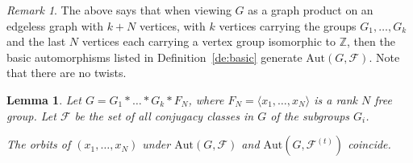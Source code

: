 \documentclass[a4paper,english,11pt]{article}
\newtheorem{lemma}[de]{Lemma}
\theoremstyle{definition}
\theoremstyle{remark}
\newtheorem{rk}[de]{Remark}
\newcommand{\Aut}{\mathrm{Aut}}
\newcommand{\calf}{\mathcal{F}}
\begin{document}
\begin{rk}\label{rk:FR}
The above says that when viewing $G$ as a graph product on an edgeless graph with $k+N$ vertices, with $k$ vertices carrying the groups $G_1,\dots,G_k$ and the last $N$ vertices each carrying a vertex group isomorphic to $\mathbb{Z}$, then the basic automorphisms listed in Definition~\ref{de:basic} generate $\Aut(G,\calf)$. Note that there are no twists. 
\end{rk}

\begin{lemma}\label{lemma:fouxe-rabinovitch}
Let $G=G_1\ast\dots\ast G_k\ast F_N$, where $F_N=\langle x_1,\dots,x_N\rangle$ is a rank $N$ free group. Let $\calf$ be the set of all conjugacy classes in $G$ of the subgroups $G_i$.

The orbits of $(x_1,\dots,x_N)$ under $\Aut(G,\calf)$ and $\Aut(G,\calf^{(t)})$ coincide.
\end{lemma}
\end{document}
